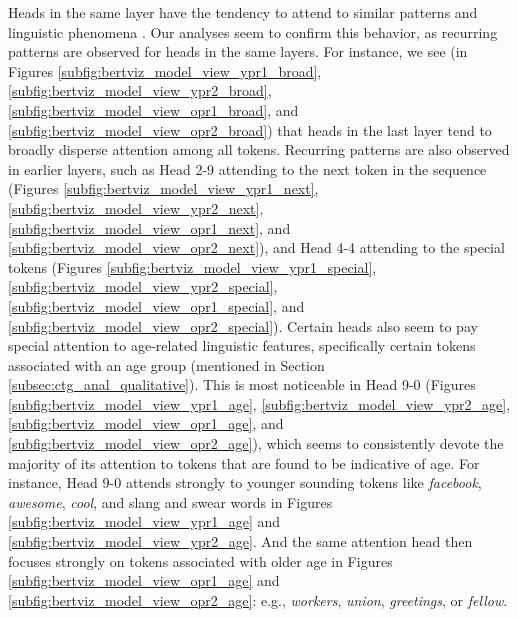 Heads in the same layer have the tendency to attend to similar patterns and linguistic phenomena \cite{clark-etal-2019-bert}. Our analyses seem to confirm this behavior, as recurring patterns are observed for heads in the same layers. For instance, we see (in Figures \ref{subfig:bertviz_model_view_ypr1_broad}, \ref{subfig:bertviz_model_view_ypr2_broad}, \ref{subfig:bertviz_model_view_opr1_broad}, and \ref{subfig:bertviz_model_view_opr2_broad}) that heads in the last layer tend to broadly disperse attention among all tokens. Recurring patterns are also observed in earlier layers, such as Head 2-9 attending to the next token in the sequence (Figures \ref{subfig:bertviz_model_view_ypr1_next}, \ref{subfig:bertviz_model_view_ypr2_next}, \ref{subfig:bertviz_model_view_opr1_next}, and \ref{subfig:bertviz_model_view_opr2_next}), and Head 4-4 attending to the special tokens (Figures \ref{subfig:bertviz_model_view_ypr1_special}, \ref{subfig:bertviz_model_view_ypr2_special}, \ref{subfig:bertviz_model_view_opr1_special}, and \ref{subfig:bertviz_model_view_opr2_special}). Certain heads also seem to pay special attention to age-related linguistic features, specifically certain tokens associated with an age group (mentioned in Section \ref{subsec:ctg_anal_qualitative}). This is most noticeable in Head 9-0 (Figures \ref{subfig:bertviz_model_view_ypr1_age}, \ref{subfig:bertviz_model_view_ypr2_age}, \ref{subfig:bertviz_model_view_opr1_age}, and \ref{subfig:bertviz_model_view_opr2_age}), which seems to consistently devote the majority of its attention to tokens that are found to be indicative of age. For instance, Head 9-0 attends strongly to younger sounding tokens like \textit{facebook}, \textit{awesome}, \textit{cool}, and slang and swear words in Figures \ref{subfig:bertviz_model_view_ypr1_age} and \ref{subfig:bertviz_model_view_ypr2_age}. And the same attention head then focuses strongly on tokens associated with older age in Figures \ref{subfig:bertviz_model_view_opr1_age} and \ref{subfig:bertviz_model_view_opr2_age}: e.g., \textit{workers}, \textit{union}, \textit{greetings}, or \textit{fellow}.




